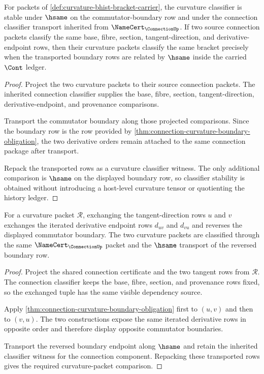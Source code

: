 \begin{theorem}
\label{thm:curvature-bracket-classifier-obligation}
For packets of \autoref{def:curvature-bhist-bracket-carrier}, the curvature classifier is stable under $\hsame$ on the commutator-boundary row and under the connection classifier transport inherited from $\NameCert_{\ConnectionUp}$. If two source connection packets classify the same base, fibre, section, tangent-direction, and derivative-endpoint rows, then their curvature packets classify the same bracket precisely when the transported boundary rows are related by $\hsame$ inside the carried $\Cont$ ledger.
\end{theorem}
\begin{proof}
Project the two curvature packets to their source connection packets. The inherited connection classifier supplies the base, fibre, section, tangent-direction, derivative-endpoint, and provenance comparisons.

Transport the commutator boundary along those projected comparisons. Since the boundary row is the row provided by \autoref{thm:connection-curvature-boundary-obligation}, the two derivative orders remain attached to the same connection package after transport.

Repack the transported rows as a curvature classifier witness. The only additional comparison is $\hsame$ on the displayed boundary row, so classifier stability is obtained without introducing a host-level curvature tensor or quotienting the history ledger.
\end{proof}

\begin{theorem}
\label{thm:curvature-antisymmetric-bracket-obligation}
For a curvature packet $\mathcal{R}$, exchanging the tangent-direction rows $u$ and $v$ exchanges the iterated derivative endpoint rows $d_{uv}$ and $d_{vu}$ and reverses the displayed commutator boundary. The two curvature packets are classified through the same $\NameCert_{\ConnectionUp}$ packet and the $\hsame$ transport of the reversed boundary row.
\end{theorem}
\begin{proof}
Project the shared connection certificate and the two tangent rows from $\mathcal{R}$. The connection classifier keeps the base, fibre, section, and provenance rows fixed, so the exchanged tuple has the same visible dependency source.

Apply \autoref{thm:connection-curvature-boundary-obligation} first to $(u,v)$ and then to $(v,u)$. The two constructions expose the same iterated derivative rows in opposite order and therefore display opposite commutator boundaries.

Transport the reversed boundary endpoint along $\hsame$ and retain the inherited classifier witness for the connection component. Repacking these transported rows gives the required curvature-packet comparison.
\end{proof}

